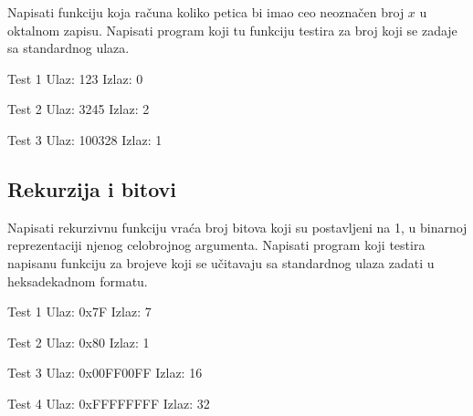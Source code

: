 \begin{Exercise}[label=212]
Napisati funkciju koja računa koliko petica bi imao ceo
  neoznačen broj $x$ u oktalnom zapisu. Napisati program koji
  tu funkciju testira za broj koji se zadaje sa standardnog ulaza.
  
\begin{minitest}
\begin{test}{Test 1}
Ulaz:   123        
Izlaz:  0             
\end{test}
\end{minitest}
\begin{minitest}
\begin{test}{Test 2}
Ulaz:   3245      
Izlaz:  2              
\end{test}
\end{minitest}
\begin{minitest}
\begin{test}{Test 3}
Ulaz:   100328
Izlaz:  1
\end{test}
\end{minitest}  
\end{Exercise}
\begin{Answer}[ref=212]
\end{Answer}


\subsection{Rekurzija i bitovi}
\begin{Exercise}[label=103]
Napisati rekurzivnu funkciju vraća broj bitova koji su postavljeni na 1, u binarnoj reprezentaciji njenog celobrojnog argumenta.  Napisati program koji testira napisanu funkciju za brojeve koji se učitavaju sa standardnog ulaza zadati u heksadekadnom formatu. 


\begin{minitest}
\begin{test}{Test 1}
Ulaz:  0x7F    
Izlaz:  7             
\end{test}
\end{minitest}
\begin{minitest}
\begin{test}{Test 2}
Ulaz:  0x80
Izlaz:  1         
\end{test}
\end{minitest}
\begin{minitest}
\begin{test}{Test 3}
Ulaz:   0x00FF00FF
Izlaz:  16
\end{test}
\begin{test}{Test 4}
Ulaz:   0xFFFFFFFF       
Izlaz:  32
\end{test}
\end{minitest}  
\end{Exercise}
\begin{Answer}[ref=103]
\end{Answer}

